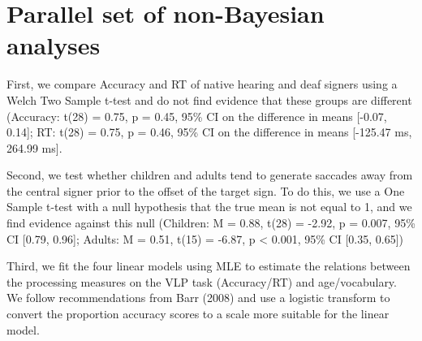 \documentclass[oneside]{report}
\begin{document}
\section{Parallel set of non-Bayesian
analyses}\label{parallel-set-of-non-bayesian-analyses}

First, we compare Accuracy and RT of native hearing and deaf signers
using a Welch Two Sample t-test and do not find evidence that these
groups are different (Accuracy: t(28) = 0.75, p = 0.45, 95\% CI on the
difference in means {[}-0.07, 0.14{]}; RT: t(28) = 0.75, p = 0.46, 95\%
CI on the difference in means {[}-125.47 ms, 264.99 ms{]}.

Second, we test whether children and adults tend to generate saccades
away from the central signer prior to the offset of the target sign. To
do this, we use a One Sample t-test with a null hypothesis that the true
mean is not equal to 1, and we find evidence against this null
(Children: M = 0.88, t(28) = -2.92, p = 0.007, 95\% CI {[}0.79, 0.96{]};
Adults: M = 0.51, t(15) = -6.87, p \textless{} 0.001, 95\% CI {[}0.35,
0.65{]})

Third, we fit the four linear models using MLE to estimate the relations
between the processing measures on the VLP task (Accuracy/RT) and
age/vocabulary. We follow recommendations from Barr (2008) and use a
logistic transform to convert the proportion accuracy scores to a scale
more suitable for the linear model.
\begin{table}

\caption[Results for MLE models fit to data in Experiment 1.1.]{\label{tab:unnamed-chunk-10}Results for the four linear models fit using Maxiumum Likelihood Estimation. All p-values are one-sided to reflect our directional hypotheses about the VLP measures improving over development.}
\centering
{}
\end{table}
\end{document}
